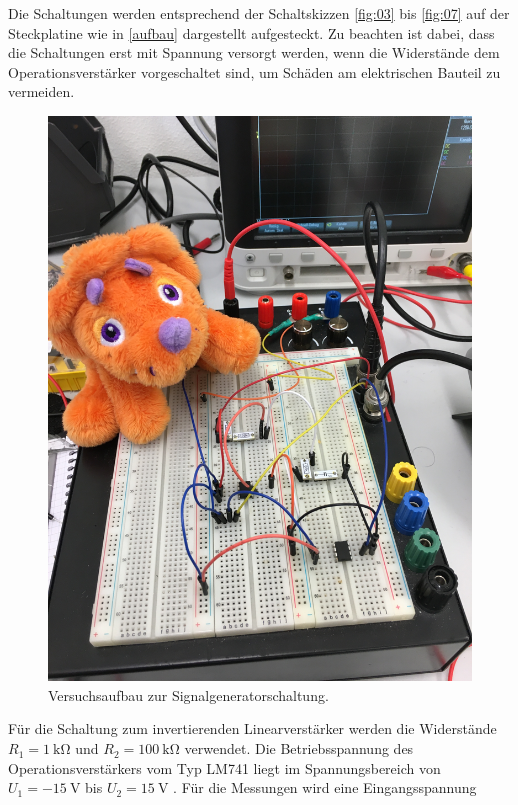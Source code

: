 \noindent Die Schaltungen werden entsprechend der Schaltskizzen \ref{fig:03} bis
\ref{fig:07} auf der Steckplatine wie in \autoref{aufbau} dargestellt
aufgesteckt. Zu beachten ist dabei, dass die Schaltungen erst mit Spannung
versorgt werden, wenn die Widerstände dem Operationsverstärker vorgeschaltet
sind, um Schäden am elektrischen Bauteil zu vermeiden. \\
\begin{figure}
  \centering
  \includegraphics[scale=0.03]{ressources/aufbau.JPG}
  \caption{Versuchsaufbau zur Signalgeneratorschaltung.}
  \label{aufbau}
\end{figure}
\noindent Für die Schaltung zum invertierenden Linearverstärker werden die
Widerstände $R_1 = \SI{1}{\kilo\ohm}$ und $R_2 = \SI{100}{\kilo\ohm}$
verwendet. Die Betriebsspannung des Operationsverstärkers vom Typ LM741
liegt im Spannungsbereich von $U_1 = -\SI{15}{\volt}$ bis $U_2 = \SI{15}{\volt}$
\cite{datenblatt}. Für die Messungen wird eine Eingangsspannung
